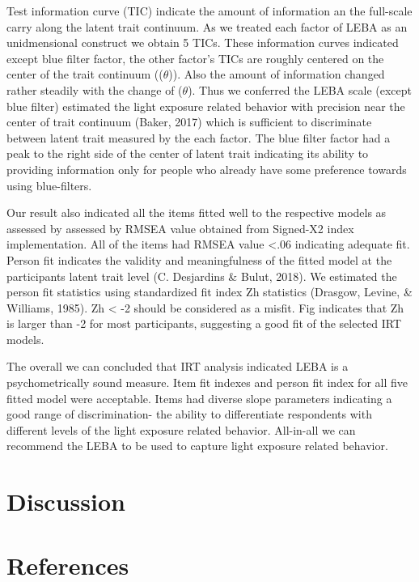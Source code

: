 \documentclass[
  english,
  man]{apa6}
\begin{document}
Test information curve (TIC) indicate the amount of information an the full-scale carry along the latent trait continuum. As we treated each factor of LEBA as an unidmensional construct we obtain 5 TICs. These information curves indicated except blue filter factor, the other factor's TICs are roughly centered on the center of the trait continuum ((\(\theta\))). Also the amount of information changed rather steadily with the change of (\(\theta\)). Thus we conferred the LEBA scale (except blue filter) estimated the light exposure related behavior with precision near the center of trait continuum (Baker, 2017) which is sufficient to discriminate between latent trait measured by the each factor. The blue filter factor had a peak to the right side of the center of latent trait indicating its ability to providing information only for people who already have some preference towards using blue-filters.

Our result also indicated all the items fitted well to the respective models as assessed by assessed by RMSEA value obtained from Signed-X2 index implementation. All of the items had RMSEA value \textless.06 indicating adequate fit. Person fit indicates the validity and meaningfulness of the fitted model at the participants latent trait level (C. Desjardins \& Bulut, 2018). We estimated the person fit statistics using standardized fit index Zh statistics (Drasgow, Levine, \& Williams, 1985). Zh \textless{} -2 should be considered as a misfit. Fig indicates that Zh is larger than -2 for most participants, suggesting a good fit of the selected IRT models.

The overall we can concluded that IRT analysis indicated LEBA is a psychometrically sound measure. Item fit indexes and person fit index for all five fitted model were acceptable. Items had diverse slope parameters indicating a good range of discrimination- the ability to differentiate respondents with different levels of the light exposure related behavior. All-in-all we can recommend the LEBA to be used to capture light exposure related behavior.

\hypertarget{discussion}{%
\section{Discussion}\label{discussion}}

\newpage

\hypertarget{references}{%
\section{References}\label{references}}
\end{document}
